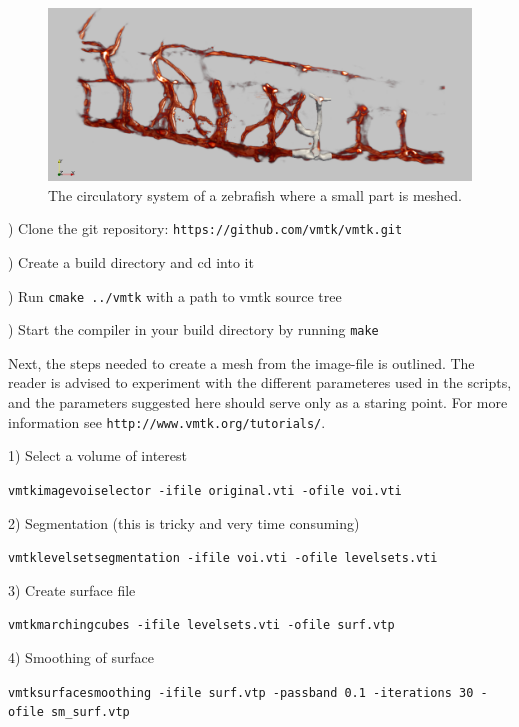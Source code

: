 \documentclass[epsfig,11pt]{article}
\begin{document}
 \begin{figure}[h!] 
\begin{center}
  \includegraphics[scale=0.3]{overview2.png}
  \end{center}
  \caption{The circulatory system of a zebrafish where a small part is meshed.}
\label{fig:circulatory_system}
\end{figure}

) Clone the git repository: {\color{Strings} \texttt{https://github.com/vmtk/vmtk.git}}

) Create a build directory and cd into it

) Run \texttt{cmake ../vmtk} with a path to vmtk source tree

) Start the compiler in your build directory by running \texttt{make}

Next, the steps needed to create a mesh from the image-file is outlined. The reader is advised to experiment with the different parameteres used in the scripts, and the parameters suggested here should serve only as a staring point. For more information see {\color{Strings}\texttt{http://www.vmtk.org/tutorials/}}.

\vspace{0.5cm}

1) Select a volume of interest
\begin{framed}       
    \texttt{vmtkimagevoiselector -ifile original.vti -ofile voi.vti}
\end{framed}
2) Segmentation (this is tricky and very time consuming)
\begin{framed}       
    \texttt{vmtklevelsetsegmentation -ifile voi.vti -ofile levelsets.vti}
\end{framed}
3) Create surface file
\begin{framed}       
    \texttt{vmtkmarchingcubes -ifile levelsets.vti -ofile surf.vtp}
\end{framed}
4) Smoothing of surface
\begin{framed}       
    \texttt{vmtksurfacesmoothing -ifile surf.vtp -passband 0.1 -iterations 30 -ofile sm\_surf.vtp}
\end{framed}
\end{document}
